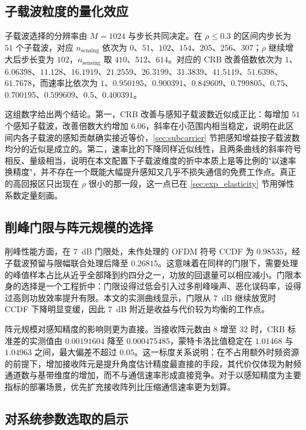 \subsection{子载波粒度的量化效应}

子载波选择的分辨率由 $M=1024$ 与步长共同决定。在 $\rho\le0.3$ 的区间内步长为 $51$ 个子载波，对应 $n_{\mathrm{sensing}}$ 依次为 $0$、$51$、$102$、$154$、$205$、$256$、$307$；$\rho$ 继续增大后步长变为 $102$，$n_{\mathrm{sensing}}$ 取 $410$、$512$、$614$。对应的 CRB 改善倍数依次为 $1$、$6.06398$、$11.128$、$16.1919$、$21.2559$、$26.3199$、$31.3839$、$41.5119$、$51.6398$、$61.7678$，而速率比依次为 $1$、$0.950195$、$0.900391$、$0.849609$、$0.799805$、$0.75$、$0.700195$、$0.599609$、$0.5$、$0.400391$。

这组数字给出两个结论。第一，CRB 改善与感知子载波数近似成正比：每增加 $51$ 个感知子载波，改善倍数大约增加 $6.06$，斜率在小范围内相当稳定，说明在此区间内各子载波的感知贡献确实接近等价，\ref{sec:subcarrier} 节把感知增益按子载波数均分的近似是成立的。第二，速率比的下降同样近似线性，且两条曲线的斜率符号相反、量级相当，说明在本文配置下子载波维度的折中本质上是等比例的"以速率换精度"，并不存在一个既能大幅提升感知又几乎不损失通信的免费工作点。真正的高回报区只出现在 $\rho$ 很小的那一段，这一点已在 \ref{sec:exp_elasticity} 节用弹性系数定量刻画。

\subsection{削峰门限与阵元规模的选择}

削峰性能方面，在 $7$~dB 门限处，未作处理的 OFDM 符号 CCDF 为 $0.98535$，经子载波预留与限幅联合处理后降至 $0.26815$。这意味着在同样的门限下，需要处理的峰值样本占比从近乎全部降到约四分之一，功放的回退量可以相应减小。门限本身的选择是一个工程折中：门限设得过低会引入过多削峰噪声、恶化误码率，设得过高则功放效率提升有限。本文的实测曲线显示，门限从 $7$~dB 继续放宽时 CCDF 下降明显变缓，因此 $7$~dB 附近是收益与代价较为均衡的工作点。

阵元规模对感知精度的影响则更为直接。当接收阵元数由 $8$ 增至 $32$ 时，CRB 标准差的实测值由 $0.00191604$ 降至 $0.000475485$，蒙特卡洛比值稳定在 $1.01468$ 与 $1.04963$ 之间，最大偏差不超过 $0.05$。这一标度关系说明：在不占用额外时频资源的前提下，增加接收阵元是提升角度估计精度最直接的手段，其代价仅体现为射频通道数与基带维度的增加，而不与通信速率形成直接竞争。对于以感知精度为主要指标的部署场景，优先扩充接收阵列比压缩通信速率更为划算。

\subsection{对系统参数选取的启示}


